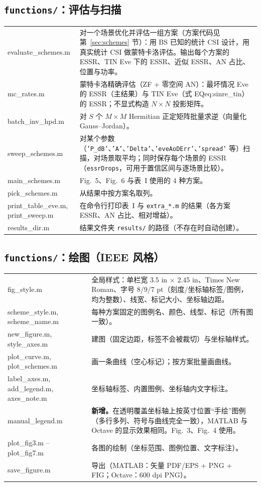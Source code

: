 \documentclass[11pt,a4paper]{ctexart}
\newcommand{\code}[1]{\texttt{#1}}
\begin{document}
\subsection{\code{functions/}：评估与扫描}
\begin{longtable}{>{\ttfamily\small}p{4.6cm}p{11.2cm}}
\toprule
evaluate\_schemes.m & 对一个场景优化并评估一组方案（方案代码见第~\ref{sec:schemes} 节）：用 BS 已知的统计 CSI 设计，用真实统计 CSI 做蒙特卡洛评估。输出每个方案的 ESSR、TIN Eve 下的 ESSR、近似 ESSR、AN 占比、位置与功率。\\
mc\_rates.m & 蒙特卡洛精确评估（ZF + 零空间 AN）：最坏情况 Eve 的 ESSR（主结果）与 TIN Eve（式 EQ{eq:sinre_tin}）的 ESSR；不显式构造 $N\times N$ 投影矩阵。\\
batch\_inv\_hpd.m & 对 $S$ 个 $M\times M$ Hermitian 正定矩阵批量求逆（向量化 Gauss--Jordan）。\\
sweep\_schemes.m & 对某个参数（\code{'P\_dB'}、\code{'A'}、\code{'Delta'}、\code{'eveAoDErr'}、\code{'spread'} 等）扫描，对场景取平均；同时保存每个场景的 ESSR（\code{essrDrops}，可用于置信区间与逐场景比较）。\\
main\_schemes.m & Fig.~5、Fig.~6 与表~I 使用的 4 种方案。\\
pick\_schemes.m & 从结果中按方案名取列。\\
print\_table\_eve.m, print\_sweep.m & 在命令行打印表~I 与 \code{extra\_*.m} 的结果（各方案 ESSR、AN 占比、相对增益）。\\
results\_dir.m & 结果文件夹 \code{results/} 的路径（不存在时自动创建）。\\
\bottomrule
\end{longtable}

\subsection{\code{functions/}：绘图（IEEE 风格）}
\begin{longtable}{>{\ttfamily\small}p{4.6cm}p{11.2cm}}
\toprule
fig\_style.m & 全局样式：单栏宽 3.5 in $\times$ 2.45 in、Times New Roman、字号 8/9/7 pt（刻度/坐标轴标签/图例，均为整数）、线宽、标记大小、坐标轴边距。\\
scheme\_style.m, scheme\_name.m & 每种方案固定的图例名、颜色、线型、标记（所有图一致）。\\
new\_figure.m, style\_axes.m & 建图（固定边距，标签不会被裁切）与坐标轴样式。\\
plot\_curve.m, plot\_schemes.m & 画一条曲线（空心标记）；按方案批量画曲线。\\
label\_axes.m, add\_legend.m, axes\_note.m & 坐标轴标签、内置图例、坐标轴内文字标注。\\
manual\_legend.m & \textbf{新增。}在透明覆盖坐标轴上按英寸位置“手绘”图例（多行多列、符号与曲线完全一致），MATLAB 与 Octave 的显示效果相同。Fig.~3、Fig.~4 使用。\\
plot\_fig3.m -- plot\_fig7.m & 各图的绘制（坐标范围、图例位置、文字标注）。\\
save\_figure.m & 导出（MATLAB：矢量 PDF/EPS + PNG + FIG；Octave：600 dpi PNG）。\\
\bottomrule
\end{longtable}
\end{document}
